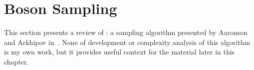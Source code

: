 \section{Boson Sampling}
\label{sec:BosenSampling}
This section presents a review of \bosonsampling{}: a sampling algorithm
presented by Aaronson and Arkhipov in~\cite{bosonsampling}. None of development
or complexity analysis of this algorithm is my own work, but it provides useful
context for the material later in this chapter.

